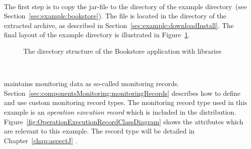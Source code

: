 \

\noindent The first step is to copy the \Kieker{} jar-file \file{\mainJar} to the  directory of the example directory~(see Section~\ref{sec:example:bookstore}). The file is located in the  directory of the extracted \Kieker{} archive, as described in Section~\ref{sec:example:downloadInstall}. %
The final layout of the example directory is illustrated in Figure~\ref{fig:KiekerBookstoreExample}.

\begin{figure}[H]
\begin{graybox}
\end{graybox}
\caption{The directory structure of the Bookstore application with \Kieker{} libraries}
\label{fig:KiekerBookstoreExample}
\end{figure}


\quad\

\noindent \Kieker{} maintains monitoring data as  so-called monitoring records. %
Section~\ref{sec:componentsMonitoring:monitoringRecords} describes how to define and use custom monitoring record types. %
The monitoring record type used in this example is an \textit{operation execution record} which %
is included in the \Kieker{} distribution. %
Figure~\ref{fig:OperationExecutionRecordClassDiagram} shows the %
attributes which  are relevant to this example. %
The record type will be detailed in Chapter~\ref{chap:aspectJ} .

